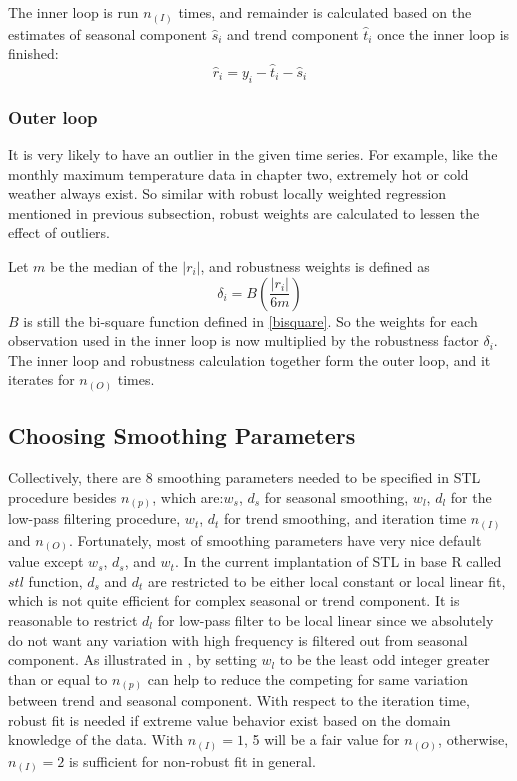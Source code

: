 The inner loop is run $n_{(I)}$ times, and remainder is calculated based on the
estimates of seasonal component $\hat s_i$ and trend component $\hat t_i$ once
the inner loop is finished:
\begin{equation} 
\hat r_i = y_i - \hat t_i - \hat s_i
\end{equation}

\subsubsection{Outer loop}

It is very likely to have an outlier in the given time series. For example, like
the monthly maximum temperature data in chapter two, extremely hot or cold weather 
always exist. So similar with robust locally weighted regression mentioned 
in previous subsection, robust weights are calculated to lessen the effect of 
outliers.

Let $m$ be the median of the $|r_i|$, and robustness weights is defined as
\begin{equation}
\delta_i = B\left(\frac{|r_i|}{6m}\right)
\end{equation}
$B$ is still the bi-square function defined in \ref{bisquare}. So the weights
for each observation used in the inner loop is now multiplied by the robustness
factor $\delta_i$. The inner loop and robustness calculation together form the
outer loop, and it iterates for $n_{(O)}$ times.

\subsection{Choosing Smoothing Parameters}

Collectively, there are 8 smoothing parameters needed to be specified in STL
procedure besides $n_{(p)}$, which are:$w_s$, $d_s$ for seasonal smoothing, 
$w_l$, $d_l$ for the low-pass filtering procedure, $w_t$, $d_t$ for trend 
smoothing, and iteration time $n_{(I)}$ and $n_{(O)}$. Fortunately, most of 
smoothing parameters have very nice default value except $w_s$, $d_s$, and $w_t$.
In the current implantation of STL in base R called $stl$ function, $d_s$ and 
$d_t$ are restricted to be either local constant or local linear fit, which is 
not quite efficient for complex seasonal or trend component. It is reasonable to 
restrict
$d_l$ for low-pass filter to be local linear since we absolutely do not want any
variation with high frequency is filtered out from seasonal component. As 
illustrated in \cite{Cleveland:1990}, by setting $w_l$ to be the least odd integer 
greater than or equal to $n_{(p)}$ can help to reduce the competing for same
variation between trend and seasonal component. With respect to the iteration time,
robust fit is needed if extreme value behavior exist based on the domain knowledge
of the data. With $n_{(I)}=1$, 5 will be a fair value for $n_{(O)}$, otherwise,
$n_{(I)}=2$ is sufficient for non-robust fit in general.

